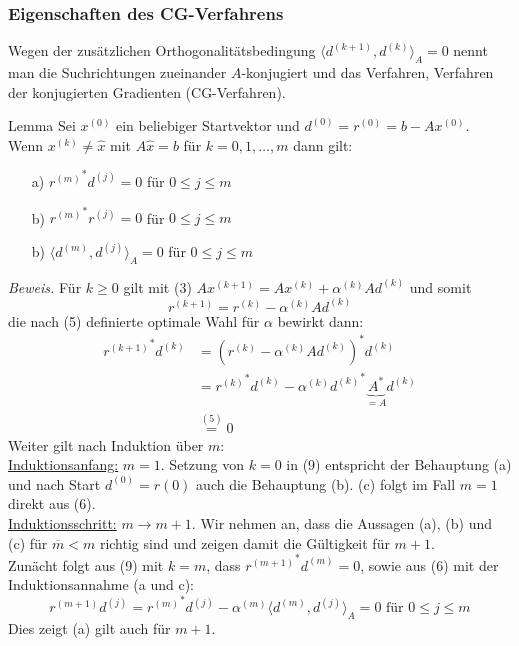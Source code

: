 \documentclass{article}
\begin{document}
\subsubsection{Eigenschaften des CG-Verfahrens}
Wegen der zusätzlichen Orthogonalitätsbedingung $\langle d^{(k+1)},d^{(k)}\rangle_A=0$ nennt man die 
Suchrichtungen zueinander $A$-konjugiert und das Verfahren, Verfahren der konjugierten Gradienten (CG-Verfahren). 
\begin{thmbox}{Lemma}
    Sei $x^{(0)}$ ein beliebiger Startvektor und $d^{(0)}=r^{(0)}=b-Ax^{(0)}$. \\
    Wenn $x^{(k)}\neq \hat{x}$ mit $A\hat{x}=b$ für $k=0,1,\dotsc, m$ dann gilt:
    \begin{enumerate}
        \item[a)] ${r^{(m)}}^*d^{(j)}=0$ für $0\leq j \le m$
        \item[b)] ${r^{(m)}}^*r^{(j)}=0$ für $0\leq j \le m$ 
        \item[b)] $\langle d^{(m)}, d^{(j)}\rangle_A=0$ für $0\leq j \le m$ 
    \end{enumerate}
\end{thmbox}
\textit{Beweis.} Für $k\geq 0$ gilt mit (3) $Ax^{(k+1)} = Ax^{(k)} + \alpha^{(k)} Ad^{(k)}$ und somit 
\[r^{(k+1)}=r^{(k)}-\alpha^{(k)}Ad^{(k)}\tag{8}\]
die nach (5) definierte optimale Wahl für $\alpha$ bewirkt dann:
\begin{align*}
    {r^{(k+1)}}^*d^{(k)} &= (r^{(k)}-\alpha^{(k)}Ad^{(k)})^* d^{(k)} \\
    &= {r^{(k)}}^* d^{(k)} - \alpha^{(k)}{d^{(k)}}^*\underbrace{A^*}_{=A}d^{(k)} \\
    &\stackrel{(5)}{=} 0 \tag{9}
\end{align*}
Weiter gilt nach Induktion über $m$: \\
\underline{Induktionsanfang:} $m=1$. Setzung von $k=0$ in (9) entspricht der Behauptung (a) 
und nach Start $d^{(0)}=r{(0)}$ auch die Behauptung (b). (c) folgt im Fall $m=1$ direkt aus (6). \\
\underline{Induktionsschritt:} $m\rightarrow m+1$. Wir nehmen an, dass die Aussagen (a), (b) und (c) 
für $\overline{m}<m$ richtig sind und zeigen damit die Gültigkeit für $m+1$. \\
Zunächt folgt aus (9) mit $k=m$, dass ${r^{(m+1)}}^*d^{(m)} = 0$, sowie aus (6) mit der Induktionsannahme (a und c):
\[{r^{(m+1)}}d^{(j)} = {r^{(m)}}^*d^{(j)} - \alpha^{(m)}\langle d^{(m)}, d^{(j)} \rangle_A = 0 
\text{ für } 0\leq j\leq m\]
Dies zeigt (a) gilt auch für $m+1$. \\
\end{document}

